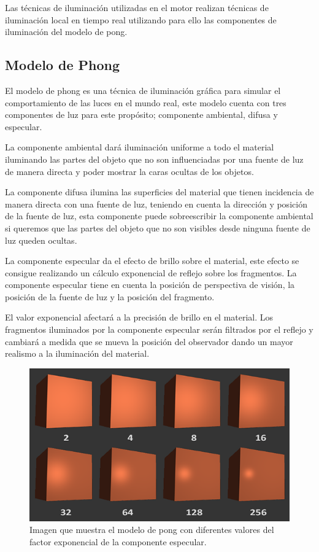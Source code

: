 \documentclass[a4paper, 17pt]{book}
\begin{document}
Las técnicas de iluminación utilizadas en el motor realizan técnicas de iluminación local en tiempo real utilizando para ello las
componentes de iluminación del modelo de pong.

\subsection{Modelo de Phong} 
\label{sec:Modelo de Phong}

El modelo de phong es una técnica de iluminación gráfica para simular el comportamiento de las luces en el mundo real, este modelo
cuenta con tres componentes de luz para este propósito; componente ambiental, difusa y especular.

La componente ambiental dará iluminación uniforme a todo el material iluminando las partes del objeto que no son influenciadas por
una fuente de luz de manera directa y poder mostrar la caras ocultas de los objetos.

La componente difusa ilumina las superficies del material que tienen incidencia de manera directa con una fuente de luz, teniendo en
cuenta la dirección y posición de la fuente de luz, esta componente puede sobreescribir la componente ambiental si queremos que las
partes del objeto que no son visibles desde ninguna fuente de luz queden ocultas.

La componente especular da el efecto de brillo sobre el material, este efecto se consigue realizando un cálculo exponencial de reflejo
sobre los fragmentos. La componente especular tiene en cuenta la posición de perspectiva de visión, la posición de la fuente de luz
y la posición del fragmento.

El valor exponencial afectará a la precisión de brillo en el material. Los fragmentos iluminados por la componente especular serán
filtrados por el reflejo y cambiará a medida que se mueva la posición del observador dando un mayor realismo a la iluminación del
material.

\begin{figure}[hbt!]
    \centering
    \includegraphics[scale=0.5, keepaspectratio]{img/basic_lighting_specular_shininess.png}
    \caption{Imagen que muestra el modelo de pong con diferentes valores del factor exponencial de la componente especular.}
    \label{figura:Component}
\end{figure}
\end{document}
